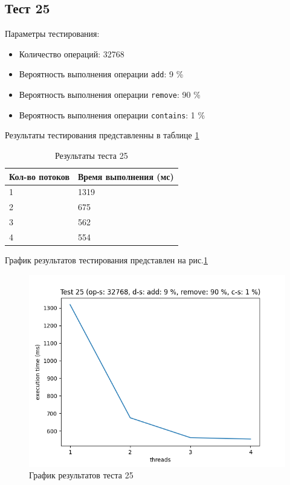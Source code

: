 \subsection*{Тест 25}

Параметры тестирования:

\begin{itemize}
    \item Количество операций: 32768
    \item Вероятность выполнения операции \verb|add|: 9 \%
    \item Вероятность выполнения операции \verb|remove|: 90 \%
    \item Вероятность выполнения операции \verb|contains|: 1 \%
\end{itemize}

Результаты тестирования представленны в таблице \ref{tab:results25}


\begin{table}[H]
    \centering
    \begin{tabular}{|l|l|}
        \hline
        Кол-во потоков & Время выполнения (мс) \\
        \hline
        1 & 1319 \\
        \hline
        2 & 675 \\
        \hline
        3 & 562 \\
        \hline
        4 & 554 \\
        \hline
    \end{tabular}
    \caption{Результаты теста 25}
    \label{tab:results25}
\end{table}
        

График результатов тестирования представлен на рис.\ref{fig:plot25}

\begin{figure}[H]
    \centering
    \includegraphics[width=0.7\linewidth]{photo/plot25}
    \caption{График результатов теста 25}
    \label{fig:plot25}
\end{figure}

